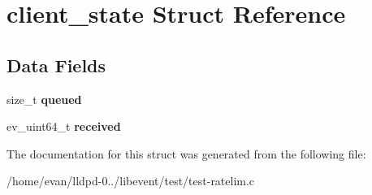 \section{client\-\_\-state \-Struct \-Reference}
\label{structclient__state}
\subsection*{\-Data \-Fields}
\begin{DoxyCompactItemize}
\item 
size\-\_\-t {\bfseries queued}\label{structclient__state_ab57ef30f94fcf6670be4b9b6fafdc4a2}

\item 
ev\-\_\-uint64\-\_\-t {\bfseries received}\label{structclient__state_a8befb22147e92336009d3ddf1e755c67}

\end{DoxyCompactItemize}


\-The documentation for this struct was generated from the following file\-:\begin{DoxyCompactItemize}
\item 
/home/evan/lldpd-\/0../libevent/test/test-\/ratelim.\-c\end{DoxyCompactItemize}
